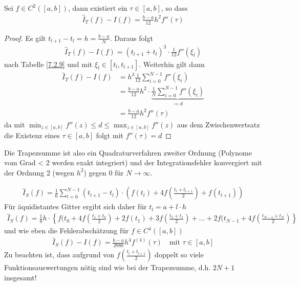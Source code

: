 \begin{Leme}\label{7.2.11}
  Sei $f\in C^2([a,b])$, dann existiert ein $\tau \in[a,b]$, so dass
  \begin{gather}
    \hat{I}_T(f) -I(f) = \frac{b-a}{12}h^2 f''(\tau)
    \label{VII.2.12}
  \end{gather}

  \begin{proof}
    Es gilt $t_{l+1}-t_l = h= \frac{b-a}{N}$.
    Daraus folgt
    \begin{gather*}
      \hat{I}_T(f)-I(f)=(t_{l+1}+t_l)^3\cdot\frac{1}{12}f''(\xi_l)
    \end{gather*}
    nach Tabelle \ref{7.2.9} und mit
    $\xi_l\in[t_l,t_{l+1}]$.
    Weiterhin gilt dann
    \begin{align*}
      \hat{I}_T(f) - I(f) &= h^3\frac{1}{12}\sum_{i=0}^{N-1}f''(\xi_i)\\
                          &= \frac{b-a}{12}h^2 \cdot \underbrace{
                            \frac{1}{N}\sum_{i=0}^{N-1}f''(\xi_i)
                            }_{\coloneqq d}\\
                          &= \frac{b-a}{12}h^2 f''(\tau)
    \end{align*}
    da mit $\min_{z\in[a,b]} f''(z) \leq d \leq \max_{z\in[a,b]}f''(z)$
    aus dem Zwischenwertsatz die Existenz eines $\tau\in[a,b]$ folgt
    mit $f''(\tau) = d$
  \end{proof}
\end{Leme}

Die Trapezsumme ist also ein
Quadraturverfahren zweiter Ordnung
(Polynome vom Grad < 2 werden exakt integriert) und der
Integrationsfehler konvergiert mit der Ordnung 2 (wegen $h^2$) gegen 0
für $N\longrightarrow \infty$.

\begin{gather}
  \hat{I}_S(f) = \frac{1}{6}\sum_{l=0}^{N-1} (t_{l+1}-t_l)
  \cdot \left(f(t_l) +4f(\frac{t_l+t_{l+1}}{2}) + f(t_{l+1})
  \right)
  \label{VII.2.13}
\end{gather}
Für äquidistantes Gitter ergibt sich daher für $t_l=a+l\cdot h$
\begin{gather}
  \hat{I}_S(f) = \frac{1}{8}h\cdot
  \left\{
    f(t_0+4f\left(\frac{t_1+t_0}{2}\right) 
    +2f(t_1) + 3f\left(\frac{t_2+t_1}{2}\right)
    + \ldots +2f(t_{N-1}
    +4f\left(\frac{t_{N-1}+t_N}{2}\right)
  \right\}
  \label{VII.2.14}
\end{gather}
und wie eben die Fehlerabschätzung
für $f\in C^4([a,b])$
\begin{gather}
  \hat{I}_S(f) -I(f) =
  \frac{b-a}{2880}h^4f^{(4)}(\tau)
  \quad \text{mit } \tau\in[a,b]
  \label{VII.2.15}
\end{gather}
Zu beachten ist, dass aufgrund von
$f\left(\frac{t_l+t_{l+1}}{2}\right)$
doppelt so viele Funktionsauswertungen nötig sind
wie bei der Trapezsumme, d.h. $2N+1$ insgesamt!

